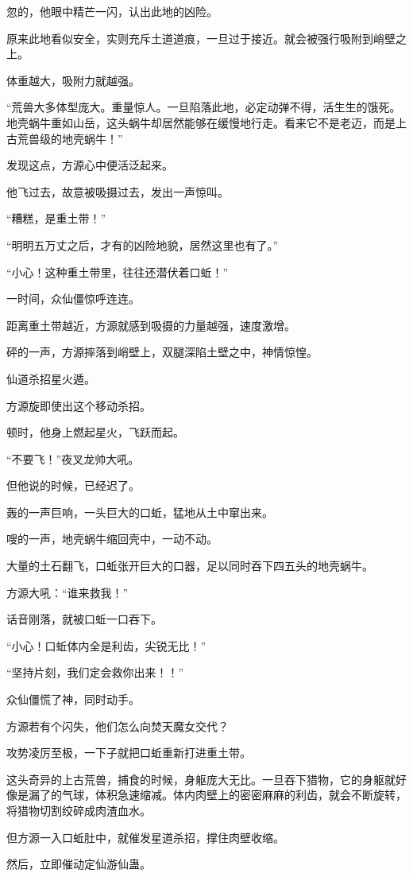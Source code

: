 \begin{this_body}
忽的，他眼中精芒一闪，认出此地的凶险。

原来此地看似安全，实则充斥土道道痕，一旦过于接近。就会被强行吸附到峭壁之上。

体重越大，吸附力就越强。

“荒兽大多体型庞大。重量惊人。一旦陷落此地，必定动弹不得，活生生的饿死。地壳蜗牛重如山岳，这头蜗牛却居然能够在缓慢地行走。看来它不是老迈，而是上古荒兽级的地壳蜗牛！”

发现这点，方源心中便活泛起来。

他飞过去，故意被吸摄过去，发出一声惊叫。

“糟糕，是重土带！”

“明明五万丈之后，才有的凶险地貌，居然这里也有了。”

“小心！这种重土带里，往往还潜伏着口蚯！”

一时间，众仙僵惊呼连连。

距离重土带越近，方源就感到吸摄的力量越强，速度激增。

砰的一声，方源摔落到峭壁上，双腿深陷土壁之中，神情惊惶。

仙道杀招星火遁。

方源旋即使出这个移动杀招。

顿时，他身上燃起星火，飞跃而起。

“不要飞！”夜叉龙帅大吼。

但他说的时候，已经迟了。

轰的一声巨响，一头巨大的口蚯，猛地从土中窜出来。

嗖的一声，地壳蜗牛缩回壳中，一动不动。

大量的土石翻飞，口蚯张开巨大的口器，足以同时吞下四五头的地壳蜗牛。

方源大吼：“谁来救我！”

话音刚落，就被口蚯一口吞下。

“小心！口蚯体内全是利齿，尖锐无比！”

“坚持片刻，我们定会救你出来！！”

众仙僵慌了神，同时动手。

方源若有个闪失，他们怎么向焚天魔女交代？

攻势凌厉至极，一下子就把口蚯重新打进重土带。

这头奇异的上古荒兽，捕食的时候，身躯庞大无比。一旦吞下猎物，它的身躯就好像是漏了的气球，体积急速缩减。体内肉壁上的密密麻麻的利齿，就会不断旋转，将猎物切割绞碎成肉渣血水。

但方源一入口蚯肚中，就催发星道杀招，撑住肉壁收缩。

然后，立即催动定仙游仙蛊。


\end{this_body}
